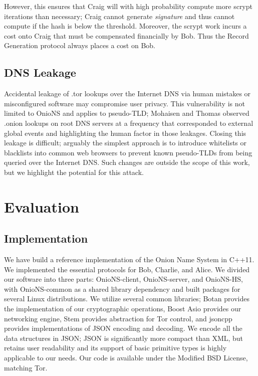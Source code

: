 \documentclass[conference]{IEEEtran}
\begin{document}

However, this ensures that Craig will with high probability compute more scrypt iterations than necessary; Craig cannot generate \emph{signature} and thus cannot compute if the hash is below the threshold. Moreover, the scrypt work incurs a cost onto Craig that must be compensated financially by Bob. Thus the Record Generation protocol always places a cost on Bob.

\subsection{DNS Leakage}

Accidental leakage of .tor lookups over the Internet DNS via human mistakes or misconfigured software may compromise user privacy. This vulnerability is not limited to OnioNS and applies to pseudo-TLD; Mohaisen and Thomas observed .onion lookups on root DNS servers at a frequency that corresponded to external global events and highlighting the human factor in those leakages\cite{thomasmeasuring}. Closing this leakage is difficult; arguably the simplest approach is to introduce whitelists or blacklists into common web browsers to prevent known pseudo-TLDs from being queried over the Internet DNS. Such changes are outside the scope of this work, but we highlight the potential for this attack.

\section{Evaluation}
\label{sec:eval}

\subsection{Implementation}

We have build a reference implementation of the Onion Name System in C++11. We implemented the essential protocols for Bob, Charlie, and Alice. We divided our software into three parts: OnioNS-client, OnioNS-server, and OnioNS-HS, with OnioNS-common as a shared library dependency and built packages for several Linux distributions. We utilize several common libraries; Botan\cite{BotanLib} provides the implementation of our cryptographic operations, Boost Asio\cite{AsioLib} provides our networking engine, Stem provides abstraction for Tor control, and jsoncpp\cite{JsonCppLib} provides implementations of JSON encoding and decoding. We encode all the data structures in JSON; JSON is significantly more compact than XML, but retains user readability and its support of basic primitive types is highly applicable to our needs. Our code is available under the Modified BSD License, matching Tor.
\end{document}
